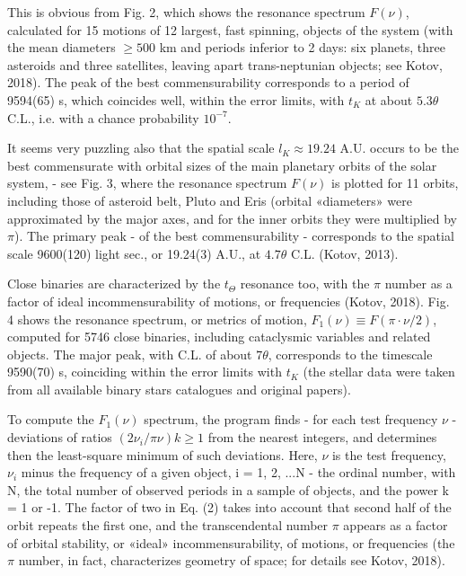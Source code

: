 \documentclass[twoside,draft]{article}
\begin{document}
\begin{sloppypar}
This is obvious from Fig. 2, which shows the resonance spectrum $F( \nu )$, calculated for 15 motions of 12 largest, fast spinning, objects of the system (with the mean diameters $\geq 500$ km and periods inferior to 2 days: six planets, three asteroids and three satellites, leaving apart trans-neptunian objects; see Kotov, 2018). The peak of the best commensurability corresponds to a period of 9594(65) s, which coincides well, within the error limits, with $t_K$ at about $5.3 \theta$ C.L., i.e. with a chance probability $10^{-7}$.

It seems very puzzling also that the spatial scale $l_{K} \approx 19.24$ A.U. occurs to be the best commensurate with orbital sizes of the main planetary orbits of the solar system, - see Fig. 3, where the resonance spectrum $F( \nu )$ is plotted for 11 orbits, including those of asteroid belt, Pluto and Eris (orbital «diameters» were approximated by the major axes, and for the inner orbits they were multiplied by $\pi$). The primary peak - of the best commensurability - corresponds to the spatial scale 9600(120) light sec., or 19.24(3) A.U., at $4.7 \theta$ C.L. (Kotov, 2013).

Close binaries are characterized by the $t_{\Theta}$ resonance too, with the $\pi$ number as a factor of ideal incommensurability of motions, or frequencies (Kotov, 2018). Fig. 4 shows the resonance spectrum, or metrics of motion, $F_{1} (\nu) \equiv F(\pi \cdot \nu/2)$, computed for 5746 close binaries, including cataclysmic variables and related objects. The major peak, with C.L. of about $7 \theta$, corresponds to the timescale 9590(70) s, coinciding within the error limits with $t_{K}$ (the stellar data were taken from all available binary stars catalogues and original papers).

To compute the $F_{1} (\nu)$ spectrum, the program finds - for each test frequency $\nu$ - deviations of ratios $(2\nu_{i} /\pi \nu) k \geq 1$ from the nearest integers, and determines then the least-square minimum of such deviations. Here, $\nu$ is the test frequency, $\nu_{i}$ minus the frequency of a given object, i = 1, 2, ...N - the ordinal number, with N, the total number of observed periods in a sample of objects, and the power k = 1 or -1. The factor of two in Eq. (2) takes into account that second half of the orbit repeats the first one, and the transcendental number $\pi$ appears as a factor of orbital stability, or «ideal» incommensurability, of motions, or frequencies (the $\pi$ number, in fact, characterizes geometry of space; for details see Kotov, 2018).


\end{sloppypar}
\end{document}
